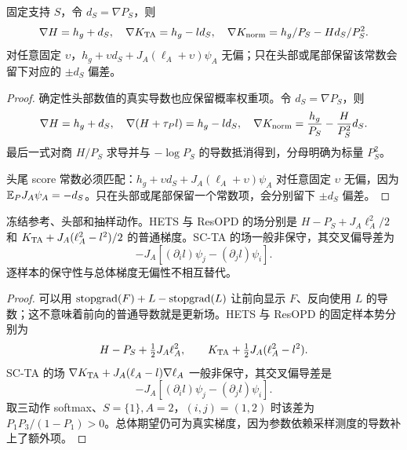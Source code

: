 \begin{proposition}[确定性头部导数与头尾常数匹配]
固定支持 $S$，令 $d_S=\nabla P_S$，则
\begin{equation}
\nabla H=h_g+d_S,\quad \nabla K_{\rm TA}=h_g-ld_S,\quad
\nabla K_{\rm norm}=h_g/P_S-Hd_S/P_S^2.
\end{equation}
对任意固定 $\upsilon$，$h_g+\upsilon d_S+J_A(\ell_A+\upsilon)\psi_A$ 无偏；只在头部或尾部保留该常数会留下对应的 $\pm d_S$ 偏差。
\end{proposition}
\begin{proof}
确定性头部数值的真实导数也应保留概率权重项。令 $d_S=\nabla P_S$，则
\begin{equation}
\nabla H=h_g+d_S,\quad
\nabla(H+\tau_Pl)=h_g-ld_S,\quad
\nabla K_{\rm norm}=\frac{h_g}{P_S}-\frac{H}{P_S^2}d_S.
\end{equation}
最后一式对商 $H/P_S$ 求导并与 $-\log P_S$ 的导数抵消得到，分母明确为标量 $P_S^2$。

头尾 score 常数必须匹配：$h_g+\upsilon d_S+J_A(\ell_A+\upsilon)\psi_A$ 对任意固定 $\upsilon$ 无偏，因为 $\mathbb E_PJ_A\psi_A=-d_S$。只在头部或尾部保留一个常数项，会分别留下 $\pm d_S$ 偏差。
\end{proof}

\begin{proposition}[固定样本势与非保守更新场]
冻结参考、头部和抽样动作。HETS 与 ResOPD 的场分别是 $H-P_S+J_A\ell_A^2/2$ 和 $K_{\rm TA}+J_A(\ell_A^2-l^2)/2$ 的普通梯度。SC-TA 的场一般非保守，其交叉偏导差为
\begin{equation}
-J_A[(\partial_i l)\psi_j-(\partial_j l)\psi_i].
\end{equation}
逐样本的保守性与总体梯度无偏性不相互替代。
\end{proposition}
\begin{proof}
可以用 $\operatorname{stopgrad}(F)+L-\operatorname{stopgrad}(L)$ 让前向显示 $F$、反向使用 $L$ 的导数；这不意味着前向的普通导数就是更新场。HETS 与 ResOPD 的固定样本势分别为
\begin{equation}
H-P_S+\tfrac12J_A\ell_A^2,\qquad
K_{\rm TA}+\tfrac12J_A(\ell_A^2-l^2).
\end{equation}
SC-TA 的场 $\nabla K_{\rm TA}+J_A(\ell_A-l)\nabla\ell_A$ 一般非保守，其交叉偏导差是
\begin{equation}
-J_A[(\partial_i l)\psi_j-(\partial_j l)\psi_i].
\end{equation}
取三动作 softmax、$S=\{1\},A=2$，$(i,j)=(1,2)$ 时该差为 $P_1P_3/(1-P_1)>0$。总体期望仍可为真实梯度，因为参数依赖采样测度的导数补上了额外项。
\end{proof}

